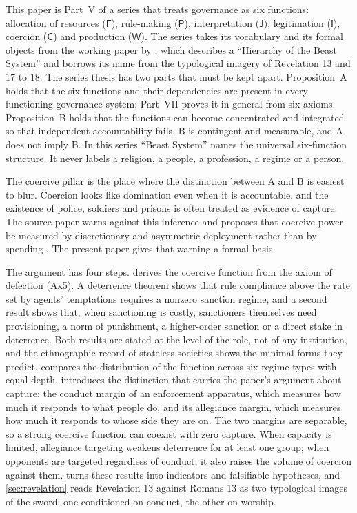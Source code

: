 \documentclass[11pt,letterpaper]{article}
\theoremstyle{definition}
\theoremstyle{remark}
\newcommand{\pF}{\mathsf{F}}
\newcommand{\pP}{\mathsf{P}}
\newcommand{\pJ}{\mathsf{J}}
\newcommand{\pI}{\mathsf{I}}
\newcommand{\pC}{\mathsf{C}}
\newcommand{\pW}{\mathsf{W}}
\begin{document}
This paper is Part~V of a series that treats governance as six functions: allocation of resources ($\pF$), rule-making ($\pP$), interpretation ($\pJ$), legitimation ($\pI$), coercion ($\pC$) and production ($\pW$). The series takes its vocabulary and its formal objects from the working paper by \citet{largo2026hbs}, which describes a ``Hierarchy of the Beast System'' and borrows its name from the typological imagery of Revelation 13 and 17 to 18. The series thesis has two parts that must be kept apart. Proposition~A holds that the six functions and their dependencies are present in every functioning governance system; Part~VII proves it in general from six axioms. Proposition~B holds that the functions can become concentrated and integrated so that independent accountability fails. B is contingent and measurable, and A does not imply B. In this series ``Beast System'' names the universal six-function structure. It never labels a religion, a people, a profession, a regime or a person.

The coercive pillar is the place where the distinction between A and B is easiest to blur. Coercion looks like domination even when it is accountable, and the existence of police, soldiers and prisons is often treated as evidence of capture. The source paper warns against this inference and proposes that coercive power be measured by discretionary and asymmetric deployment rather than by spending \citep[Section 4]{largo2026hbs}. The present paper gives that warning a formal basis.

The argument has four steps.  derives the coercive function from the axiom of defection (Ax5). A deterrence theorem shows that rule compliance above the rate set by agents' temptations requires a nonzero sanction regime, and a second result shows that, when sanctioning is costly, sanctioners themselves need provisioning, a norm of punishment, a higher-order sanction or a direct stake in deterrence. Both results are stated at the level of the role, not of any institution, and the ethnographic record of stateless societies shows the minimal forms they predict.  compares the distribution of the function across six regime types with equal depth.  introduces the distinction that carries the paper's argument about capture: the conduct margin of an enforcement apparatus, which measures how much it responds to what people do, and its allegiance margin, which measures how much it responds to whose side they are on. The two margins are separable, so a strong coercive function can coexist with zero capture. When capacity is limited, allegiance targeting weakens deterrence for at least one group; when opponents are targeted regardless of conduct, it also raises the volume of coercion against them.  turns these results into indicators and falsifiable hypotheses, and \cref{sec:revelation} reads Revelation 13 against Romans 13 as two typological images of the sword: one conditioned on conduct, the other on worship.
\end{document}

